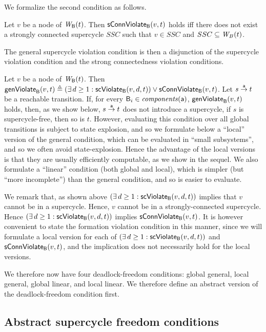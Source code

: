 We formalize the second condition as follows.

\label{def:sConn.violation}
 Let $v$ be a node of $\wfg{\B}{t}$.   Then $\connViol{v}{t}$ holds iff there does not exist a 
strongly connected
 supercycle $SSC$ such that $v \in SSC$ and $SSC \sub \wfg{B}{t}$.
\ed






The general supercycle violation condition is then a disjunction of the supercycle violation condition
and the strong connectedness violation conditions.


\label{def:formation.violation} 
\label{defn:formation.violation} 
Let $v$ be a node of $\wfg{\B}{t}$.
Then $\genViol{v}{t}  \df (\exs d \ge 1: \scViol{v}{d}{t}) \lor \connViol{v}{t}$.
\ed
%
Let $s \goesto[\act] t$ be a reachable transition. If, for every $\B_i \in \cmps{\act}$,
$\formViol{v}{t}$ holds, then, as we show below, $s \goesto[\act] t$ does not introduce a
supercycle, \ie if $s$ is supercycle-free, then so is $t$.  However, evaluating this condition over
all global transitions is subject to state explosion, and so we formulate below a ``local'' version
of the general condition, which can be evaluated in ``small subsystems'', and so we often avoid
state-explosion. Hence the advantage of the local versions is that they are usually efficiently
computable, as we show in the sequel.  We also formulate a ``linear'' condition (both global and
local), which is simpler (but ``more incomplete'') than the general condition, and so is easier to
evaluate.

We remark that, as shown above $(\exs d \ge 1: \scViol{v}{d}{t})$ implies that $v$ cannot be in a
supercycle. Hence, $v$ cannot be in a strongly-connected supercycle.  Hence
$(\exs d \ge 1: \scViol{v}{d}{t})$ implies $\connViol{v}{t}$. It is however convenient to state the
formation violation condition in this manner, since we will formulate a local version
for each of $(\exs d \ge 1: \scViol{v}{d}{t})$ and $\connViol{v}{t}$, and the implication does not
necessarily hold for the local versions. 

We therefore now have four deadlock-freedom conditions: global general, local general, 
global linear, and local linear. We therefore define an abstract version of 
the deadlock-freedom condition first.


\subsection{Abstract supercycle freedom conditions}


